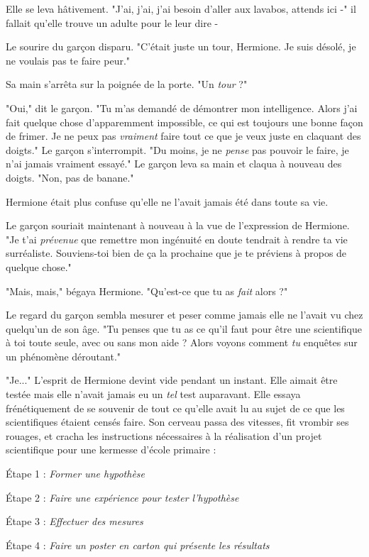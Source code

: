 Elle se leva hâtivement. "J'ai, j'ai, j'ai besoin d'aller aux lavabos, attends ici -" il fallait qu'elle trouve un adulte pour le leur dire -

Le sourire du garçon disparu. "C'était juste un tour, Hermione. Je suis désolé, je ne voulais pas te faire peur."

Sa main s'arrêta sur la poignée de la porte. "Un \emph{tour}  ?"

"Oui," dit le garçon. "Tu m'as demandé de démontrer mon intelligence. Alors j'ai fait quelque chose d'apparemment impossible, ce qui est toujours une bonne façon de frimer. Je ne peux pas \emph{vraiment}  faire tout ce que je veux juste en claquant des doigts." Le garçon s'interrompit. "Du moins, je ne \emph{pense}  pas pouvoir le faire, je n'ai jamais vraiment essayé." Le garçon leva sa main et claqua à nouveau des doigts. "Non, pas de banane."

Hermione était plus confuse qu'elle ne l'avait jamais été dans toute sa vie.

Le garçon souriait maintenant à nouveau à la vue de l'expression de Hermione. "Je t'ai \emph{prévenue}  que remettre mon ingénuité en doute tendrait à rendre ta vie surréaliste. Souviens-toi bien de ça la prochaine que je te préviens à propos de quelque chose."

"Mais, mais," bégaya Hermione. "Qu'est-ce que tu as \emph{fait}  alors ?"

Le regard du garçon sembla mesurer et peser comme jamais elle ne l'avait vu chez quelqu'un de son âge. "Tu penses que tu as ce qu'il faut pour être une scientifique à toi toute seule, avec ou sans mon aide ? Alors voyons comment \emph{tu}  enquêtes sur un phénomène déroutant."

"Je..." L'esprit de Hermione devint vide pendant un instant. Elle aimait être testée mais elle n'avait jamais eu un \emph{tel}  test auparavant. Elle essaya frénétiquement de se souvenir de tout ce qu'elle avait lu au sujet de ce que les scientifiques étaient censés faire. Son cerveau passa des vitesses, fit vrombir ses rouages, et cracha les instructions nécessaires à la réalisation d'un projet scientifique pour une kermesse d'école primaire :

Étape 1 :\emph{ Former une hypothèse} 

Étape 2 :\emph{ Faire une expérience pour tester l'hypothèse} 

Étape 3 :\emph{ Effectuer des mesures} 

Étape 4 :\emph{ Faire un poster en carton qui présente les résultats} 


